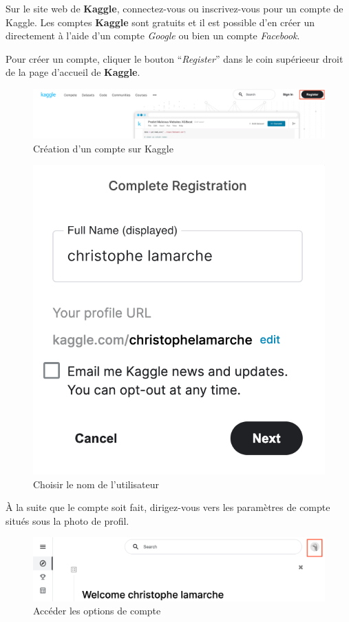 \documentclass{article}
\begin{document}
\bigbreak
Sur le site web de \textbf{Kaggle}, connectez-vous ou inscrivez-vous pour un compte de Kaggle. Les comptes \textbf{Kaggle} sont gratuits et il est possible d'en créer un directement à l'aide d'un compte \textit{Google} ou bien un compte \textit{Facebook}.

\bigbreak
Pour créer un compte, cliquer le bouton ``\textit{Register}'' dans le coin supérieeur droit de la page d'accueil de \textbf{Kaggle}.

\bigbreak
\begin{figure}[H]
  \centering
  \includegraphics[width=0.5\columnwidth]{figures/kagglesignin}
  \caption{Création d'un compte sur Kaggle}
  \label{fig:kaggle_signin}
\end{figure}

\bigbreak
\begin{figure}[H]
  \centering
  \includegraphics[width=0.5\columnwidth]{figures/create_account}
  \caption{Choisir le nom de l'utilisateur}
  \label{fig:create_account}
\end{figure}


\bigbreak
À la suite que le compte soit fait, dirigez-vous vers les paramètres de compte situés sous la photo de profil.

\bigbreak
\begin{figure}[H]
  \centering
  \includegraphics[width=0.5\columnwidth]{figures/click_account}
  \caption{Accéder les options de compte}
  \label{fig:account_options}
\end{figure}
\end{document}
